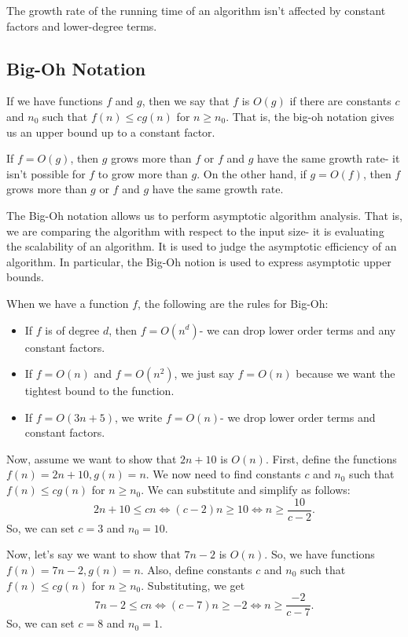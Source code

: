 \documentclass[a4paper, openany]{memoir}
\begin{document}
\noindent The growth rate of the running time of an algorithm isn't affected by constant factors and lower-degree terms.

\subsection{Big-Oh Notation}
If we have functions $f$ and $g$, then we say that $f$ is $O(g)$ if there are constants $c$ and $n_0$ such that $f(n) \leq cg(n)$ for $n \geq n_0$. That is, the big-oh notation gives us an upper bound up to a constant factor. 

\noindent If $f = O(g)$, then $g$ grows more than $f$ or $f$ and $g$ have the same growth rate- it isn't possible for $f$ to grow more than $g$. On the other hand, if $g = O(f)$, then $f$ grows more than $g$ or $f$ and $g$ have the same growth rate.

\noindent The Big-Oh notation allows us to perform asymptotic algorithm analysis. That is, we are comparing the algorithm with respect to the input size- it is evaluating the scalability of an algorithm. It is used to judge the asymptotic efficiency of an algorithm. In particular, the Big-Oh notion is used to express asymptotic upper bounds.

\noindent When we have a function $f$, the following are the rules for Big-Oh:
\begin{itemize}
    \item If $f$ is of degree $d$, then $f = O(n^d)$- we can drop lower order terms and any constant factors.
    \item If $f = O(n)$ and $f = O(n^2)$, we just say $f = O(n)$ because we want the tightest bound to the function.
    \item If $f = O(3n+5)$, we write $f = O(n)$- we drop lower order terms and constant factors.
\end{itemize}

\noindent Now, assume we want to show that $2n + 10$ is $O(n)$. First, define the functions $f(n) = 2n + 10, g(n) = n$. We now need to find constants $c$ and $n_0$ such that $f(n) \leq cg(n)$ for $n \geq n_0$. We can substitute and simplify as follows:
\[2n + 10 \leq cn \iff (c - 2)n \geq 10 \iff n \geq \frac{10}{c-2}.\]
So, we can set $c = 3$ and $n_0 = 10$.

\noindent Now, let's say we want to show that $7n - 2$ is $O(n)$. So, we have functions $f(n) = 7n - 2, g(n) = n$. Also, define constants $c$ and $n_0$ such that $f(n) \leq cg(n)$ for $n \geq n_0$. Substituting, we get
\[7n - 2 \leq cn \iff (c-7)n \geq -2 \iff n \geq \frac{-2}{c - 7}.\]
So, we can set $c = 8$ and $n_0 = 1$.
\end{document}
